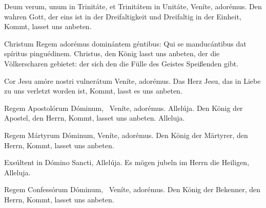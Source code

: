 \documentclass[fontsize=9pt,paper=A6,twoside,BCOR=1mm,DIV=22,headinclude]{scrarticle}
\begin{document}
\begin{paracol}{2}\pcb
	Deum verum, unum in Trinitáte, et Trinitátem in Unitáte, \red{*} Veníte, adorémus.
	\switchcolumn 
	Den wahren Gott, der eins ist in der Dreifaltigkeit und Dreifaltig in der Einheit, \red{*} Kommt, lasset uns anbeten.
\end{paracol}

\begin{paracol}{2}\pcb
	Christum Regem adorémus dominántem géntibus: \red{*} Qui se manducántibus dat spíritus pinguédinem.
	\switchcolumn 
	Christus, den König lasst uns anbeten, der die Völkerscharen gebietet: \red{*} der sich den die Fülle des Geistes Speißenden gibt.
\end{paracol}

\begin{paracol}{2}\pcb
	Cor Jesu amóre nostri vulnerátum \red{*} Veníte, adorémus.
	\switchcolumn 
	Das Herz Jesu, das in Liebe zu uns verletzt worden ist, \red{*} Kommt, lasst es uns anbeten.
\end{paracol}



\pagebreak
{}

\begin{paracol}{2}\pcb
	Regem Apostolórum Dóminum,~\red{*} Veníte, adorémus.  Allelúja.\red{)}
	\switchcolumn 
	Den König der Apostel, den Herrn, \red{*} Kommt, lasset uns anbeten.  Alleluja.\red{)}
\end{paracol}

\begin{paracol}{2}\pcb
	Regem Mártyrum Dóminum, \red{*} Veníte, adorémus.
	\switchcolumn 
	Den König der Märtyrer, den Herrn, \red{*} Kommt, lasset uns anbeten.
\end{paracol}

\begin{paracol}{2}\pcb
	Exsúltent in Dómino Sancti, \red{*} Allelúja.
	\switchcolumn 
	Es mögen jubeln im Herrn die Heiligen, \red{*} Alleluja.
\end{paracol}

\begin{paracol}{2}\pcb
	Regem Confessórum Dóminum,~\red{*} Veníte, adorémus. \TPA
	\switchcolumn 
	Den König der Bekenner, den Herrn, \red{*} Kommt, lasset uns anbeten. \OZA
\end{paracol}
\end{document}
